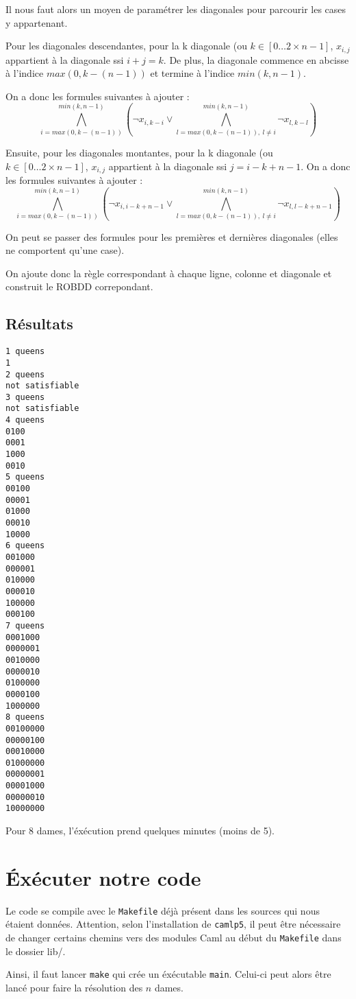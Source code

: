 \documentclass[12pt]{article}
\def\code#1{\texttt{#1}}
\begin{document}
Il nous faut alors un moyen de paramétrer les diagonales pour parcourir les cases y appartenant.

Pour les diagonales descendantes, pour la k diagonale (ou $k\in[0\dots 2\times n-1]$, $x_{i,j}$ appartient à la diagonale ssi $i+j=k$. De plus, la diagonale commence en abcisse à l'indice $max(0,k-(n-1))$ et termine à l'indice $min(k,n-1)$. %

On a donc les formules suivantes à ajouter :
$$\bigwedge_{i=max(0,k-(n-1))}^{min(k,n-1)} \left( \neg x_{i, k-i} \vee\bigwedge_{l=max(0,k-(n-1)),\ l\neq i}^{min(k,n-1)} \neg x_{l, k-l}\right)$$


Ensuite, pour les diagonales montantes, pour la k diagonale (ou $k\in[0\dots 2\times n-1]$, $x_{i,j}$ appartient à la diagonale ssi $j=i-k+n-1$.
On a donc les formules suivantes à ajouter :
$$\bigwedge_{i=max(0,k-(n-1))}^{min(k,n-1)} \left( \neg x_{i, i-k+n-1} \vee\bigwedge_{l=max(0,k-(n-1)),\ l\neq i}^{min(k,n-1)} \neg x_{l, l-k+n-1}\right)$$

On peut se passer des formules pour les premières et dernières diagonales (elles ne comportent qu'une case).

On ajoute donc la règle correspondant à chaque ligne, colonne et diagonale et construit le ROBDD correpondant.

\subsection*{Résultats}
\begin{lstlisting}
1 queens
1
2 queens
not satisfiable
3 queens
not satisfiable
4 queens
0100
0001
1000
0010
5 queens
00100
00001
01000
00010
10000
6 queens
001000
000001
010000
000010
100000
000100
7 queens
0001000
0000001
0010000
0000010
0100000
0000100
1000000
8 queens
00100000
00000100
00010000
01000000
00000001
00001000
00000010
10000000
\end{lstlisting}

Pour 8 dames, l'éxécution prend quelques minutes (moins de 5).

\section*{Éxécuter notre code}
Le code se compile avec le \code{Makefile} déjà présent dans les sources qui nous étaient données. Attention, selon l'installation de \code{camlp5}, il peut être nécessaire de changer certains chemins vers des modules Caml au début du \code{Makefile} dans le dossier lib/.

Ainsi, il faut lancer \code{make} qui crée un éxécutable \code{main}. Celui-ci peut alors être lancé pour faire la résolution des $n$ dames.
\end{document}
